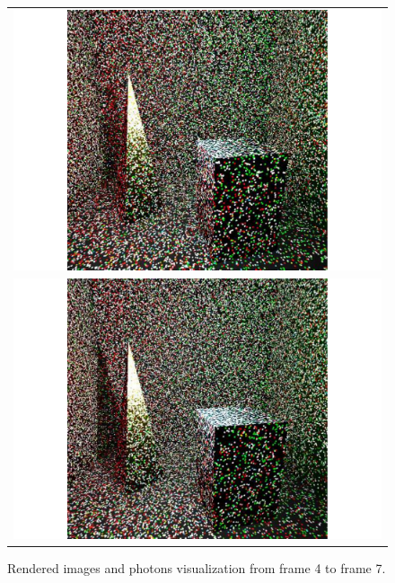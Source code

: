 \begin{figure}
\begin{center}
{\begin{tabular}{c}
\includegraphics*[scale=0.2]{imgs/pqv_frame6.pdf}\\
\includegraphics*[scale=0.2]{imgs/pqv_frame7.pdf}
\end{tabular}
}%
\renewcommand{\thefigure}{\thechapter.\arabic{figure}}
\caption[Rendered images and photons visualization from frame 4 to frame 7.]{Rendered images and photons visualization from frame 4 to frame 7.}
\label{fig:result_images2}
\end{center}
\end{figure}

